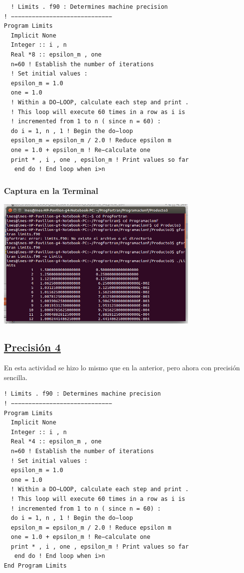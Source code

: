 \documentclass[a4paper]{article}
\begin{document}
  \begin{verbatim}
  ! Limits . f90 : Determines machine precision
! −−−−−−−−−−−−−−−−−−−−−−−−−−−−−
Program Limits
  Implicit None
  Integer :: i , n
  Real *8 :: epsilon_m , one
  n=60 ! Establish the number of iterations
  ! Set initial values :
  epsilon_m = 1.0
  one = 1.0
  ! Within a DO−LOOP, calculate each step and print .
  ! This loop will execute 60 times in a row as i is
  ! incremented from 1 to n ( since n = 60) :
  do i = 1, n , 1 ! Begin the do−loop
  epsilon_m = epsilon_m / 2.0 ! Reduce epsilon m
  one = 1.0 + epsilon_m ! Re−calculate one
  print * , i , one , epsilon_m ! Print values so far
   end do ! End loop when i>n
  \end{verbatim}
  
  








\subsubsection{Captura en la Terminal}
  \begin{center}
\includegraphics[width=10cm]{Limits.png}
\end{center}
  
  \subsection{\underline{Precisión 4}}
  En esta actividad se hizo lo mismo que en la anterior, pero ahora con precisión sencilla.
  \begin{verbatim}! Limits . f90 : Determines machine precision
! −−−−−−−−−−−−−−−−−−−−−−−−−−−−−
Program Limits
  Implicit None
  Integer :: i , n
  Real *4 :: epsilon_m , one
  n=60 ! Establish the number of iterations
  ! Set initial values :
  epsilon_m = 1.0
  one = 1.0
  ! Within a DO−LOOP, calculate each step and print .
  ! This loop will execute 60 times in a row as i is
  ! incremented from 1 to n ( since n = 60) :
  do i = 1, n , 1 ! Begin the do−loop
  epsilon_m = epsilon_m / 2.0 ! Reduce epsilon m
  one = 1.0 + epsilon_m ! Re−calculate one
  print * , i , one , epsilon_m ! Print values so far
   end do ! End loop when i>n
End Program Limits
  \end{verbatim}
  
\end{document}
